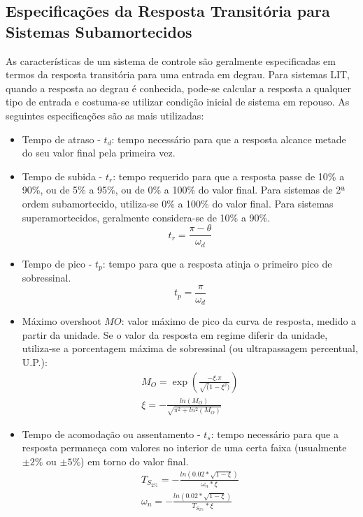 \documentclass[a4paper]{ifacconf}
\begin{document}
        \subsection{Especificações da Resposta Transitória para Sistemas Subamortecidos}
    As características de um sistema de controle são geralmente especificadas em termos da resposta transitória para uma entrada em degrau. Para sistemas LIT, quando a resposta ao degrau é conhecida, pode-se calcular a resposta a qualquer tipo de entrada e costuma-se utilizar condição inicial de sistema em repouso. As seguintes especificações são as mais utilizadas:
    \begin{itemize}
        \item  Tempo de atraso - $t_d$: tempo necessário para que a resposta alcance metade do seu valor final pela primeira vez.
        \item  Tempo de subida - $t_r$: tempo requerido para que a resposta passe de 10\% a 90\%, ou de 5\% a 95\%, ou de 0\% a 100\% do valor final. Para sistemas de 2ª ordem subamortecido, utiliza-se 0\% a 100\% do valor final. Para sistemas superamortecidos, geralmente considera-se de 10\% a 90\%.
        \begin{equation} \label{eq:tr}
            t_r = \frac{\pi-\theta}{\omega_d}
        \end{equation} 
        \item Tempo de pico - $t_p$: tempo para que a resposta atinja o primeiro pico de sobressinal.
        \begin{equation} \label{eq:tp}
            t_p = \frac{\pi}{\omega_d}
        \end{equation}
        \item Máximo overshoot $MO$: valor máximo de pico da curva de resposta, medido a partir da unidade. Se o valor da resposta em regime diferir da unidade, utiliza-se a porcentagem máxima de sobressinal (ou ultrapassagem percentual, U.P.):
        \begin{equation} \label{eq:MaxOv}
        \begin{split}
            M_O=\exp{(\frac{-\xi.\pi}{\sqrt(1-\xi^2)})}\\
            \xi=-\frac{ln\left( M_O \right)}{\sqrt{\pi^2+ln^2(M_O)}}    
        \end{split}
        \end{equation}
        \item Tempo de acomodação ou assentamento - $t_s$: tempo necessário para que a resposta permaneça com valores no interior de uma certa faixa (usualmente $\pm2\%$ ou $\pm5\%$) em torno do valor final.
        \begin{equation} \label{eq:Ts2}
        \begin{split}
            T_{S_{2\%}}=-\frac{ln\left( 0.02*\sqrt{1-\xi} \right)}{\omega_n*\xi}\\
            \omega_n=-\frac{ln\left( 0.02*\sqrt{1-\xi} \right)}{T_{S_{2\%}}*\xi}  
        \end{split}
        \end{equation}
    \end{itemize}
\end{document}
